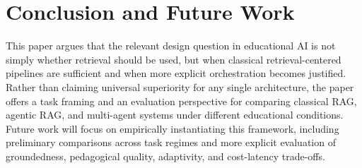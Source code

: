 \section{Conclusion and Future Work}

This paper argues that the relevant design question in educational AI is not simply whether retrieval should be used, but when classical retrieval-centered pipelines are sufficient and when more explicit orchestration becomes justified. Rather than claiming universal superiority for any single architecture, the paper offers a task framing and an evaluation perspective for comparing classical RAG, agentic RAG, and multi-agent systems under different educational conditions. Future work will focus on empirically instantiating this framework, including preliminary comparisons across task regimes and more explicit evaluation of groundedness, pedagogical quality, adaptivity, and cost-latency trade-offs.
